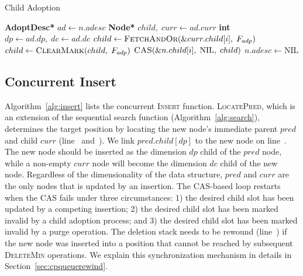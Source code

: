 \documentclass[10pt,journal,letter,compsoc]{IEEEtran}
\newcommand\NIL{\text{NIL}}
\newcommand\OR{\;\text{\textbf{or}}\;}
\begin{document}
\begin{algorithm}[t]
    \caption{Child Adoption}
    \label{alg:adoption}
    \begin{algorithmic}[1]
        \If {$n = \NIL$}
        \State \Return
        \EndIf
        \State \textbf{AdoptDesc*} $ad \gets n.adesc$
        \If {$ad=\NIL \OR dc < ad.dp \OR dp > ad.dc$}
        \State \Return
        \EndIf
        \State \textbf{Node*} $child,\;curr \gets ad.curr$ 
        \State \textbf{int} $dp \gets ad.dp,\;dc \gets ad.dc$
        \For {$i \in [dp, dc)$} \label{l:adoptionfor}
        \State $child \gets \textsc{FetchAndOr}(\&curr.child[i],\;F_{adp})$ \label{l:setadp} 
        \State $child \gets \textsc{ClearMark}(child,\;F_{adp})$
        \State $\text{\textsc{CAS}}(\&n.child[i],\;\NIL,\;child)$ \label{l:adopt}
        \EndFor
        \State $n.adesc \gets \NIL$
        \EndFunction
    \end{algorithmic}
\end{algorithm}



\subsection{Concurrent Insert}
\label{sec:cpqueueins}
Algorithm~\ref{alg:insert} lists the concurrent \textsc{Insert} function.
\textsc{LocatePred}, which is an extension of the sequential search function (Algorithm~\ref{alg:search}), determines the target position by locating the new node's immediate parent $pred$ and child $curr$ (line~ and~).
We link $pred.child[dp]$ to the new node on line~.
The new node should be inserted as the dimension $dp$ child of the $pred$ node, while a non-empty $curr$ node will become the dimension $dc$ child of the new node.
Regardless of the dimensionality of the data structure, $pred$ and $curr$ are the only nodes that is updated by an insertion.
The CAS-based loop restarts when the CAS fails under three circumstances: 1) the desired child slot has been updated by a competing insertion; 2) the desired child slot has been marked invalid by a child adoption process; and 3) the desired child slot has been marked invalid by a purge operation.
The deletion stack needs to be rewound (line~) if the new node was inserted into a position that cannot be reached by subsequent \textsc{DeleteMin} operations.
We explain this synchronization mechanism in details in Section~\ref{sec:cpqueuerewind}.
\end{document}
